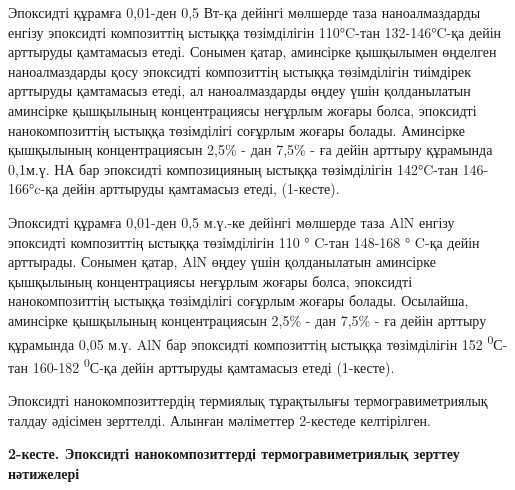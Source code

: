 Эпоксидті құрамға 0,01-ден 0,5 Вт-қа дейінгі мөлшерде таза
наноалмаздарды енгізу эпоксидті композиттің ыстыққа төзімділігін
110°C-тан 132-146°C-қа дейін арттыруды қамтамасыз етеді. Сонымен қатар,
аминсірке қышқылымен өңделген наноалмаздарды қосу эпоксидті композиттің
ыстыққа төзімділігін тиімдірек арттыруды қамтамасыз етеді, ал
наноалмаздарды өңдеу үшін қолданылатын аминсірке қышқылының
концентрациясы неғұрлым жоғары болса, эпоксидті нанокомпозиттің ыстыққа
төзімділігі соғұрлым жоғары болады. Аминсірке қышқылының концентрациясын
2,5\% - дан 7,5\% - ға дейін арттыру құрамында 0,1м.ү. НА бар эпоксидті
композицияның ыстыққа төзімділігін 142°C-тан 146-166°c-қа дейін
арттыруды қамтамасыз етеді, (1-кесте).

Эпоксидті құрамға 0,01-ден 0,5 м.ү.-ке дейінгі мөлшерде таза AlN енгізу
эпоксидті композиттің ыстыққа төзімділігін 110 ° C-тан 148-168 ° C-қа
дейін арттырады. Сонымен қатар, AlN өңдеу үшін қолданылатын аминсірке
қышқылының концентрациясы неғұрлым жоғары болса, эпоксидті
нанокомпозиттің ыстыққа төзімділігі соғұрлым жоғары болады. Осылайша,
аминсірке қышқылының концентрациясын 2,5\% - дан 7,5\% - ға дейін
арттыру құрамында 0,05 м.ү. AlN бар эпоксидті композиттің ыстыққа
төзімділігін 152 \textsuperscript{0}С-тан 160-182
\textsuperscript{0}С-қа дейін арттыруды қамтамасыз етеді (1-кесте).

Эпоксидті нанокомпозиттердің термиялық тұрақтылығы термогравиметриялық
талдау әдісімен зерттелді. Алынған мәліметтер 2-кестеде келтірілген.

{\bfseries 2-кесте. Эпоксидті нанокомпозиттерді термогравиметриялық зерттеу
нәтижелері}

